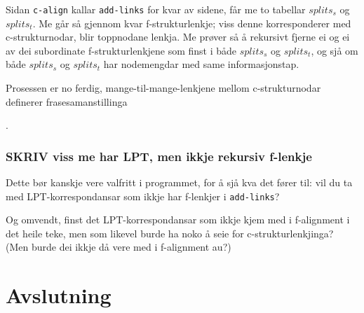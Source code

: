 \documentclass[11pt,a4paper,oneside,draft]{book}
\begin{document}
Sidan \texttt{c-align} kallar \texttt{add-links} for kvar av sidene, får me to
tabellar $splits_s$ og $splits_t$. Me går så gjennom kvar
f-strukturlenkje; viss denne korresponderer med c-strukturnodar, blir
toppnodane lenkja. Me prøver så å rekursivt fjerne ei og ei av dei subordinate
f-strukturlenkjene som finst i både $splits_s$ og $splits_t$, og sjå
om både $splits_s$ og $splits_t$ har nodemengdar med same
informasjonstap.


Prosessen er no ferdig, mange-til-mange-lenkjene mellom
c-strukturnodar definerer frasesamanstillinga

.


\subsection{\textbf{SKRIV} viss me har LPT, men ikkje rekursiv f-lenkje}
\label{sec-4.3.1}

    Dette bør kanskje vere valfritt i programmet, for å sjå kva det
    fører til: vil du ta med LPT-korrespondansar som ikkje har
    f-lenkjer i \texttt{add-links}?

    Og omvendt, finst det LPT-korrespondansar som ikkje kjem med i
    f-alignment i det heile teke, men som likevel burde ha noko å seie
    for c-strukturlenkjinga? (Men burde dei ikkje då vere med i
    f-alignment au?)



\chapter{Avslutning}
\label{sec-5}




\end{document}
